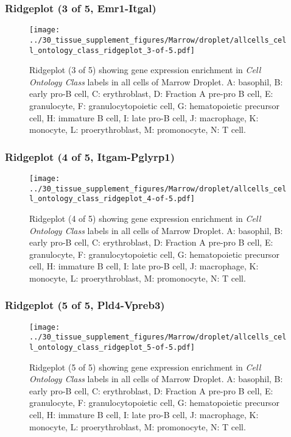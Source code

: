 \clearpage

\subsubsection{Ridgeplot (3 of 5, Emr1-Itgal)}
\begin{figure}[h]
\centering
\texttt{[image: ../30\_tissue\_supplement\_figures/Marrow/droplet/allcells\_cell\_ontology\_class\_ridgeplot\_3-of-5.pdf]}

\caption{ Ridgeplot (3 of 5)  showing gene expression enrichment in \emph{Cell Ontology Class} labels in all cells of Marrow Droplet. A: basophil, B: early pro-B cell, C: erythroblast, D: Fraction A pre-pro B cell, E: granulocyte, F: granulocytopoietic cell, G: hematopoietic precursor cell, H: immature B cell, I: late pro-B cell, J: macrophage, K: monocyte, L: proerythroblast, M: promonocyte, N: T cell.}
\end{figure}


\clearpage

\subsubsection{Ridgeplot (4 of 5, Itgam-Pglyrp1)}
\begin{figure}[h]
\centering
\texttt{[image: ../30\_tissue\_supplement\_figures/Marrow/droplet/allcells\_cell\_ontology\_class\_ridgeplot\_4-of-5.pdf]}

\caption{ Ridgeplot (4 of 5)  showing gene expression enrichment in \emph{Cell Ontology Class} labels in all cells of Marrow Droplet. A: basophil, B: early pro-B cell, C: erythroblast, D: Fraction A pre-pro B cell, E: granulocyte, F: granulocytopoietic cell, G: hematopoietic precursor cell, H: immature B cell, I: late pro-B cell, J: macrophage, K: monocyte, L: proerythroblast, M: promonocyte, N: T cell.}
\end{figure}


\clearpage

\subsubsection{Ridgeplot (5 of 5, Pld4-Vpreb3)}
\begin{figure}[h]
\centering
\texttt{[image: ../30\_tissue\_supplement\_figures/Marrow/droplet/allcells\_cell\_ontology\_class\_ridgeplot\_5-of-5.pdf]}

\caption{ Ridgeplot (5 of 5)  showing gene expression enrichment in \emph{Cell Ontology Class} labels in all cells of Marrow Droplet. A: basophil, B: early pro-B cell, C: erythroblast, D: Fraction A pre-pro B cell, E: granulocyte, F: granulocytopoietic cell, G: hematopoietic precursor cell, H: immature B cell, I: late pro-B cell, J: macrophage, K: monocyte, L: proerythroblast, M: promonocyte, N: T cell.}
\end{figure}


